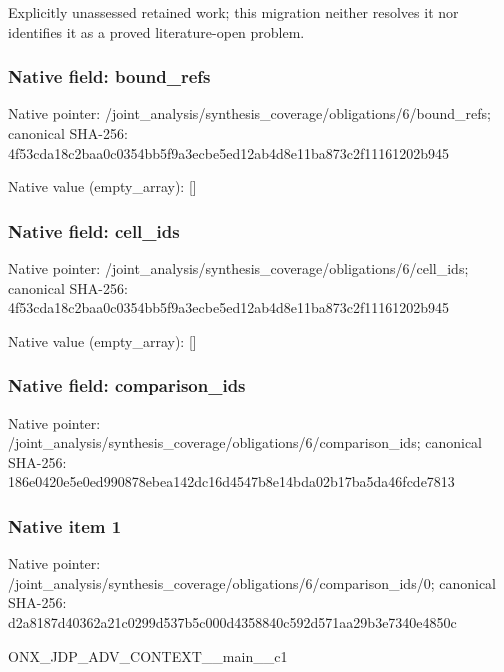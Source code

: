 \documentclass[10pt,a4paper]{article}
\begin{document}
\begingroup\raggedright\sloppy Explicitly unassessed retained work;\allowbreak{} this migration neither resolves it nor identifies it as a proved literature-open problem.\par\endgroup

\subsubsection{Native field: bound\_\allowbreak{}refs}
Native pointer: /joint\_\allowbreak{}analysis/synthesis\_\allowbreak{}coverage/obligations/6/bound\_\allowbreak{}refs; canonical SHA-256: 4f53cda18c2baa0c0354bb5f9a3ecbe5ed12ab4d8e11ba873c2f11161202b945

Native value (empty\_\allowbreak{}array): []

\subsubsection{Native field: cell\_\allowbreak{}ids}
Native pointer: /joint\_\allowbreak{}analysis/synthesis\_\allowbreak{}coverage/obligations/6/cell\_\allowbreak{}ids; canonical SHA-256: 4f53cda18c2baa0c0354bb5f9a3ecbe5ed12ab4d8e11ba873c2f11161202b945

Native value (empty\_\allowbreak{}array): []

\subsubsection{Native field: comparison\_\allowbreak{}ids}
Native pointer: /joint\_\allowbreak{}analysis/synthesis\_\allowbreak{}coverage/obligations/6/comparison\_\allowbreak{}ids; canonical SHA-256: 186e0420e5e0ed990878ebea142dc16d4547b8e14bda02b17ba5da46fcde7813

\subsubsection{Native item 1}
Native pointer: /joint\_\allowbreak{}analysis/synthesis\_\allowbreak{}coverage/obligations/6/comparison\_\allowbreak{}ids/0; canonical SHA-256: d2a8187d40362a21c0299d537b5c000d4358840c592d571aa29b3e7340e4850c

\begingroup\raggedright\sloppy ONX\_\allowbreak{}JDP\_\allowbreak{}ADV\_\allowbreak{}CONTEXT\_\allowbreak{}\_\allowbreak{}main\_\allowbreak{}\_\allowbreak{}c1\par\endgroup
\end{document}
